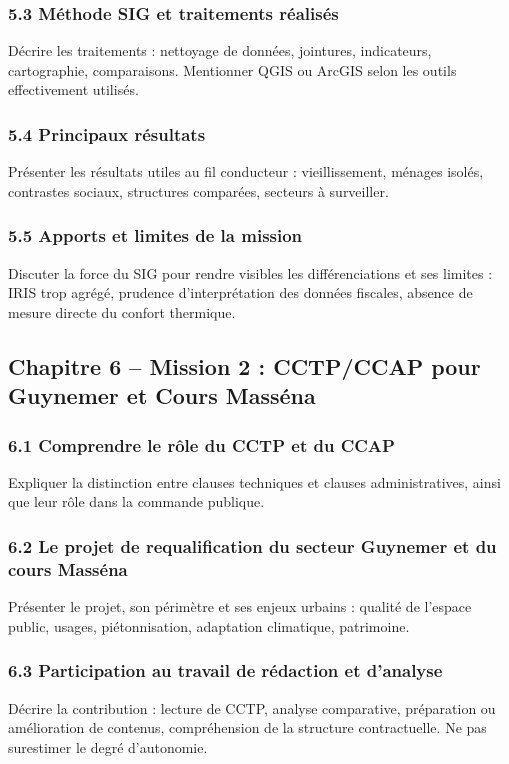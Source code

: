 \documentclass[11pt,a4paper]{article}
\begin{document}
\subsubsection{5.3 Méthode SIG et traitements réalisés}
Décrire les traitements : nettoyage de données, jointures, indicateurs, cartographie, comparaisons. Mentionner QGIS ou ArcGIS selon les outils effectivement utilisés.

\subsubsection{5.4 Principaux résultats}
Présenter les résultats utiles au fil conducteur : vieillissement, ménages isolés, contrastes sociaux, structures comparées, secteurs à surveiller.

\subsubsection{5.5 Apports et limites de la mission}
Discuter la force du SIG pour rendre visibles les différenciations et ses limites : IRIS trop agrégé, prudence d'interprétation des données fiscales, absence de mesure directe du confort thermique.

\subsection{Chapitre 6 -- Mission 2 : CCTP/CCAP pour Guynemer et Cours Masséna}

\subsubsection{6.1 Comprendre le rôle du CCTP et du CCAP}
Expliquer la distinction entre clauses techniques et clauses administratives, ainsi que leur rôle dans la commande publique.

\subsubsection{6.2 Le projet de requalification du secteur Guynemer et du cours Masséna}
Présenter le projet, son périmètre et ses enjeux urbains : qualité de l'espace public, usages, piétonnisation, adaptation climatique, patrimoine.

\subsubsection{6.3 Participation au travail de rédaction et d'analyse}
Décrire la contribution : lecture de CCTP, analyse comparative, préparation ou amélioration de contenus, compréhension de la structure contractuelle. Ne pas surestimer le degré d'autonomie.
\end{document}

